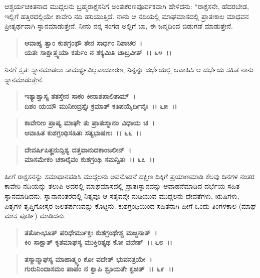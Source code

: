 ಆಶ್ಚರ್ಯಚಕಿತನಾದ ಮುದ್ಗಲನು ಬ್ರಹ್ಮರಾಕ್ಷಸನಿಗೆ ಅಂತಃಕರಣಪೂರ್ವಕವಾಗಿ ಹೇಳಿದನು: “ರಾಕ್ಷಸನೇ, ಹೆದರಬೇಡ, ಇಲ್ಲಿಗೆ ಹತ್ತಿರದಲ್ಲಿಯೇ ಕಾವೇರಿ ನದಿ ಹರಿಯುತ್ತಿದೆ. ನಾನು ಆ ನದಿಯಲ್ಲಿ ಮಾಘಮಾಸದಲ್ಲಿ ಪ್ರಾತಃಕಾಲ ಮಾಧವನ ಪ್ರೀತ್ಯರ್ಥವಾಗಿ ಸ್ನಾನಮಾಡುತ್ತೇನೆ. ನೀನು ನನ್ನ ಸಂಗಡ ಅಲ್ಲಿಗೆ ಬಾ, ಈ ಜನ್ಮದಿಂದ ಬಿಡುಗಡೆ ಮಾಡುತ್ತೇನೆ.

\begin{verse}
\textbf{ಆವಾಹ್ಯ ತ್ವಾಂ ಕುಶಗ್ರಂಥೌ ತೇನ ಸಾರ್ಧಂ ನಿಶಾಚರ~।}\\\textbf{ಯತಃ ಸಾಕ್ಷಾತ್ತ್ವಯಾ ಕರ್ತುಂ ನ ಶಕ್ಯಮಿತಿ ಚಾಬ್ರವೀತ್~।। ೬೪~।।}
\end{verse}

ನಿನಗೆ ಸ್ವತಃ ಸ್ನಾನಮಾಡಲು ಸಾಮರ್ಥ್ಯವಿಲ್ಲವಾದಕಾರಣ, ನಿನ್ನನ್ನು ದರ್ಭೆಯಲ್ಲಿ ಆವಾಹಿಸಿ ಆ ದರ್ಭೆಯ ಸಹಿತ ನಾನು ಸ್ನಾನಮಾಡುತ್ತೇನೆ.

\begin{verse}
\textbf{ಇತ್ಯಾಶ್ವಾಸ್ಯ ತತಸ್ತೇನ ಸಾಕಂ ಕೀನಾಶಪಾಲಿತಾಮ್~।}\\\textbf{ದಿಶಂ ಯಯೌ ಮುನೀಂದ್ರಸ್ತೈಃ ಕ್ರಮಾತ್ ಕತಿಪಯೈರ್ದಿನೈಃ~।। ೬೫~।। }
\end{verse}

\begin{verse}
\textbf{ಕಾವೇರೀಂ ಪ್ರಾಪ್ಯ ಮಾಘೇ ತು ಪ್ರಾತಃಸ್ಮಾನಂ ವಿಧಾಯ ಚ~।}\\\textbf{ಆವಾಹಿತ ಕುಶಗ್ರಂಥಿಸಹಿತಃ ಸತ್ಯಭಾಷಣಃ~।। ೬೬~।। }
\end{verse}

\begin{verse}
\textbf{ದೇವರ್ಷಿಪಿತೄನುದ್ದಿಶ್ಯ ದತ್ತವಾನುದಕಾಂಜಲೀನ್~।}\\\textbf{ಮಾಸಮೇಕಂ ಚಕಾರೈವಂ ಕುಶಗ್ರಂಥಿ ಸಮನ್ವಿತಃ~।। ೬೭~।।}
\end{verse}

ಹೀಗೆ ರಾಕ್ಷಸನನ್ನು ಸಮಾಧಾನಪಡಿಸಿ ಮುದ್ಗಲನು ಅವನೊಡನೆ ದಕ್ಷಿಣ ದಿಕ್ಕಿಗೆ ಪ್ರಯಾಣಮಾಡಿ ಕೆಲವು ದಿನಗಳ ನಂತರ ಕಾವೇರಿ ನದಿಯನ್ನು ತಲುಪಿ ಅದರಲ್ಲಿ ಮಾಘಮಾಸದಲ್ಲಿ ಪ್ರಾತಃಸ್ನಾನವನ್ನು ಆವಾಹನೆಮಾಡಿದ ದರ್ಭೆಯ ಸಹಿತ ಸ್ನಾನಮಾಡಿದನು. ಸ್ನಾನಾನಂತರದಲ್ಲಿ ನಿತ್ಯವೂ ಆ ಸತ್ಯವನ್ನೇ ನುಡಿಯುವ ಮುದ್ಗಲನು ದೇವತೆಗಳು, ಋಷಿಗಳು, ಪಿತೃಗಳ ತೃಪ್ತಿಗೋಸ್ಕರ ಜಲತರ್ಪಣವನ್ನು ಕೊಟ್ಟನು. ಕುಶಗ್ರಂಥಿಯಿಂದ ಸಹಿತನಾಗಿ ಹೀಗೆ ಒಂದು ತಿಂಗಳಕಾಲ (ಮಾಘ ಮಾಸ ಪೂರ್ತಿ) ಮಾಡಿದನು.

\begin{verse}
\textbf{ತತೋsಭೂತ್ ಪರಿಧೇರ್ಮುಕ್ತಿಃ ಕುಶಗ್ರಂಥೇಶ್ಚ ಮಜ್ಜನಾತ್~।}\\\textbf{ಕಿಂ ಸಾಕ್ಷಾತ್ ಕೃತಮಾಘಸ್ಯ ಮುಕ್ತಿರಿತ್ಯಥ ಕೋ ವದೇತ್~।। ೬೮~।।} 
\end{verse}

\begin{verse}
\textbf{ತಸ್ಮಾನ್ಮಾಘಸ್ಯ ಮಾಹಾತ್ಮ್ಯಂ ಕೋ ವದೇತ್ ಭುವನತ್ರಯೇ~।}\\\textbf{ಗುರುನಿಂದಾಸಮಂ ಪಾಪಂ ನ ಕ್ವಾಪಿ ಶ್ರೂಯತೇ ಕ್ವಚಿತ್~।। ೬೯~।।}
\end{verse}

